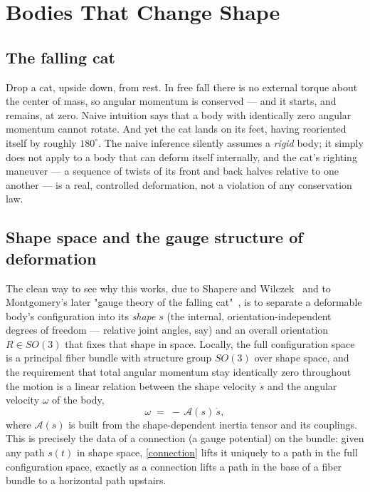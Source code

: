 \chapter{Bodies That Change Shape}
\label{shape}

\section{The falling cat}

Drop a cat, upside down, from rest. In free fall there is no
external torque about the center of mass, so angular momentum is
conserved --- and it starts, and remains, at zero. Naive intuition
says that a body with identically zero angular momentum cannot
rotate. And yet the cat lands on its feet, having reoriented itself
by roughly $180^\circ$. The naive inference silently assumes a
\emph{rigid} body; it simply does not apply to a body that can
deform itself internally, and the cat's righting maneuver --- a
sequence of twists of its front and back halves relative to one
another --- is a real, controlled deformation, not a violation of
any conservation law.

\section{Shape space and the gauge structure of deformation}

The clean way to see why this works, due to Shapere and
Wilczek~\cite{shapere+wilczek} and to Montgomery's later "gauge
theory of the falling cat"~\cite{montgomery}, is to separate a
deformable body's configuration into its \emph{shape} $s$ (the
internal, orientation-independent degrees of freedom --- relative
joint angles, say) and an overall orientation $R\in SO(3)$ that fixes
that shape in space. Locally, the full configuration space is a
principal fiber bundle with structure group $SO(3)$ over shape space,
and the requirement that total angular momentum stay identically
zero throughout the motion is a linear relation between the shape
velocity $\dot s$ and the angular velocity $\omega$ of the body,
\begin{equation}
  \omega \;=\; -\,\mathcal A(s)\,\dot s ,
  \label{connection}
\end{equation}
where $\mathcal A(s)$ is built from the shape-dependent inertia
tensor and its couplings. This is precisely the data of a connection
(a gauge potential) on the bundle: given any path $s(t)$ in shape
space, \eqref{connection} lifts it uniquely to a path in the full
configuration space, exactly as a connection lifts a path in the
base of a fiber bundle to a horizontal path upstairs.

